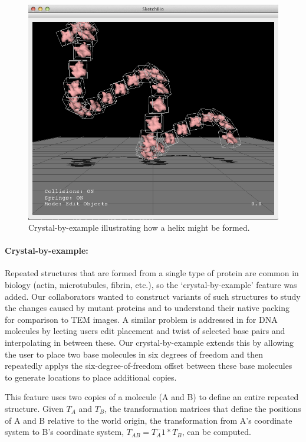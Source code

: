 \documentclass[twocolumn]{bmcart}%
\begin{document}
\begin{figure}[h]
\centering
\includegraphics[width=0.9\columnwidth]{crystalByExample.png}
\caption{Crystal-by-example illustrating how a helix might be formed.}
\label{fig:crystal_by_example}
\end{figure}
\paragraph*{Crystal-by-example:}
Repeated structures that are formed from a single type of protein are common in biology (actin, microtubules, fibrin, etc.), so the ‘crystal-by-example' feature was added.  Our collaborators wanted to construct variants of such structures to study the changes caused by mutant proteins and to understand their native packing for comparison to TEM images.  A similar problem is addressed in \cite{hornus2013easy} for DNA molecules by leeting users edit placement and twist of selected base pairs and interpolating in between these.  Our crystal-by-example extends this by allowing the user to place two base molecules in six degrees of freedom and then repeatedly applys the six-degree-of-freedom offset between these base molecules to generate locations to place additional copies.

This feature uses two copies of a molecule (A and B) to define an entire repeated structure.  Given $T_A$ and $T_B$, the transformation matrices that define the positions of A and B relative to the world origin, the transformation from A's coordinate system to B's coordinate system, $T_{AB} = T_A^-1*T_B$, can be computed.
\end{document}
